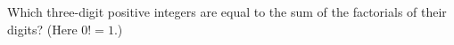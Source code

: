 Which three-digit positive integers are equal to the sum of the factorials of their digits? (Here $0!=1$.)
